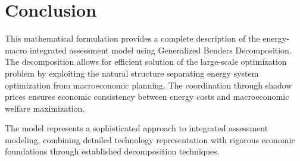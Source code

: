 \documentclass[11pt]{article}
\begin{document}
\section{Conclusion}

This mathematical formulation provides a complete description of the energy-macro integrated assessment model using Generalized Benders Decomposition. The decomposition allows for efficient solution of the large-scale optimization problem by exploiting the natural structure separating energy system optimization from macroeconomic planning. The coordination through shadow prices ensures economic consistency between energy costs and macroeconomic welfare maximization.

The model represents a sophisticated approach to integrated assessment modeling, combining detailed technology representation with rigorous economic foundations through established decomposition techniques.
\end{document}
